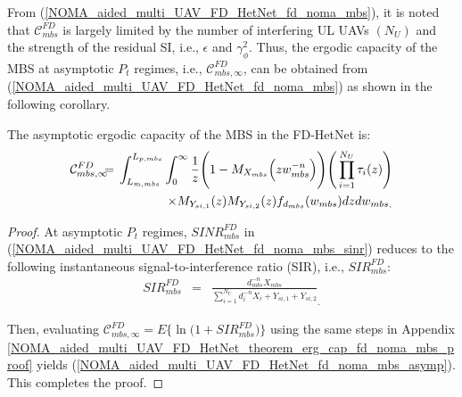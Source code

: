 From (\ref{NOMA_aided_multi_UAV_FD_HetNet_fd_noma_mbs}), it is noted that $\mathcal{C}_{mbs}^{FD}$ is largely limited by the number of interfering UL UAVs $(N_U)$ and the strength of the residual SI, i.e., $\epsilon$ and $\gamma_{\phi}^2$. Thus, the ergodic capacity of the MBS at asymptotic $P_t$ regimes, i.e., $\mathcal{C}_{mbs,\infty}^{FD}$, can be obtained from (\ref{NOMA_aided_multi_UAV_FD_HetNet_fd_noma_mbs}) as shown in the following corollary.

\begin{corollary} \label{NOMA_aided_multi_UAV_FD_HetNet_corollary_erg_cap_fd_noma_mbs}
The asymptotic ergodic capacity of the MBS in the FD-HetNet is:
\begin{eqnarray} \label{NOMA_aided_multi_UAV_FD_HetNet_fd_noma_mbs_asymp}
\mathcal{C}_{mbs,\infty}^{FD} & \hspace{-0.2cm} = & \hspace{-0.2cm} \int_{L_{m,mbs}}^{L_{p,mbs}} \int_{0}^{\infty} \frac{1}{z} \Bigg(1-M_{X_{mbs}}\Big(z w_{mbs}^{-n}\Big)\Bigg) \Bigg( \prod_{i=1}^{N_U} \tau_i(z) \Bigg) \nonumber \\
 & & \hspace{0cm} \times  M_{Y_{si,1}}(z) M_{Y_{si,2}}(z) f_{d_{mbs}}(w_{mbs}) {dz dw_{mbs}}_.
\end{eqnarray}
\end{corollary}
\begin{proof}
At asymptotic $P_t$ regimes, $SINR_{mbs}^{FD}$ in (\ref{NOMA_aided_multi_UAV_FD_HetNet_fd_noma_mbs_sinr}) reduces to the following instantaneous signal-to-interference ratio (SIR), i.e., $SIR_{mbs}^{FD}$:
\begin{eqnarray} \label{NOMA_aided_multi_UAV_FD_HetNet_fd_noma_mbs_sir}
SIR_{mbs}^{FD} & = & \frac{d_{mbs}^{-n} X_{mbs}}{\sum_{i=1}^{N_U} d_i^{-n} X_{i} + Y_{si,1} + Y_{si,2}}_.
\end{eqnarray}

Then, evaluating $\mathcal{C}_{mbs,\infty}^{FD} = E\Big\{\ln\Big(1+SIR_{mbs}^{FD}\Big)\Big\}$ using the same steps in Appendix \ref{NOMA_aided_multi_UAV_FD_HetNet_theorem_erg_cap_fd_noma_mbs_proof} yields (\ref{NOMA_aided_multi_UAV_FD_HetNet_fd_noma_mbs_asymp}). This completes the proof.
\end{proof}

